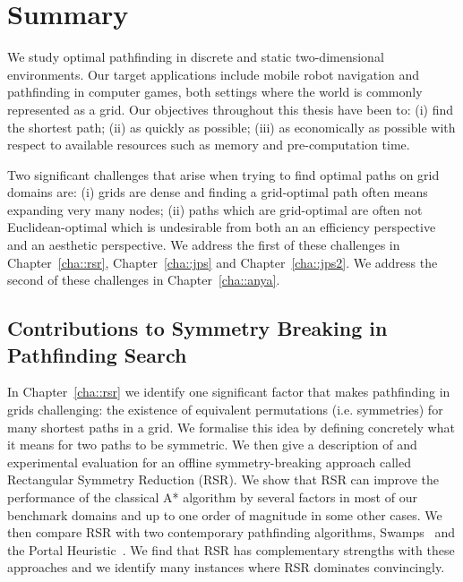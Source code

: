 \section{Summary}
\label{cha::conclusion::summary}
We study optimal pathfinding in discrete and static two-dimensional
environments. Our target applications include mobile robot navigation and
pathfinding in computer games, both settings where the world is commonly
represented as a grid. Our objectives throughout this thesis have been to: (i)
find the shortest path; (ii) as quickly as possible; (iii) as economically as
possible with respect to available resources such as memory and
pre-computation time.

Two significant challenges that arise when trying to find optimal
paths on grid domains are: (i) grids are dense and finding a grid-optimal path often
means expanding very many nodes; (ii) paths which are grid-optimal are often
not Euclidean-optimal which is undesirable from both an an efficiency
perspective and an aesthetic perspective. We address the first of these
challenges in Chapter~\ref{cha::rsr}, Chapter~\ref{cha::jps} and
Chapter~\ref{cha::jps2}.  We address the second of these challenges in
Chapter~\ref{cha::anya}.

\subsection{Contributions to Symmetry Breaking in Pathfinding Search}

In Chapter~\ref{cha::rsr} we identify one significant factor that makes
pathfinding in grids challenging: the existence of equivalent permutations 
(i.e. symmetries) for many shortest paths in a grid. We formalise this idea by defining concretely
what it means for two paths to be symmetric. We then give a description of and
experimental evaluation for an offline symmetry-breaking approach called
Rectangular Symmetry Reduction (RSR). We show that RSR can improve the
performance of the classical A{*} algorithm by several factors in most of our
benchmark domains and up to one order of magnitude in some other cases.
We then compare RSR with two contemporary pathfinding algorithms, 
Swamps~\citep{pochter10} and the Portal Heuristic~\citep{goldenberg10}.
We find that RSR has complementary strengths with these approaches and we
identify many instances where RSR dominates convincingly.

